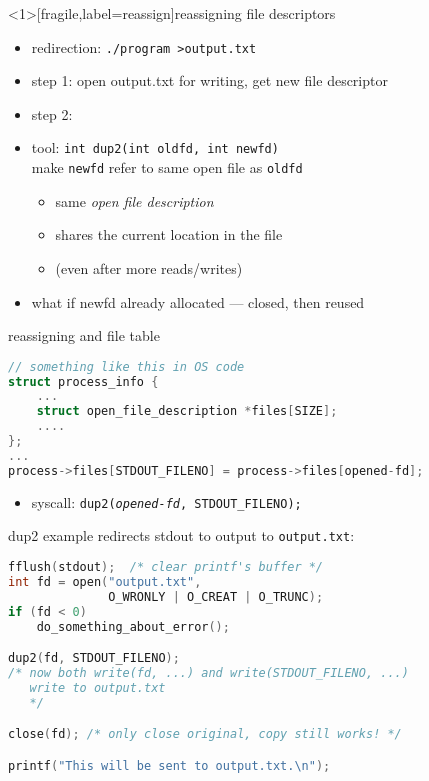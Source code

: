 \begin{frame}<1>[fragile,label=reassign]{reassigning file descriptors}
\begin{itemize}
\item redirection: \verb|./program >output.txt|
\item step 1: open output.txt for writing, get new file descriptor
\item step 2: 
\vspace{.5cm}
\item<2-> tool: \texttt{int dup2(int oldfd, int newfd)} \\
        make \texttt{newfd} refer to same open file as \texttt{oldfd}
    \begin{itemize}
    \item same \textit{open file description}
    \item shares the current location in the file
    \item (even after more reads/writes)
    \end{itemize}
\item<2-> what if newfd already allocated --- closed, then reused
\end{itemize}
\end{frame}

\begin{frame}[fragile,label=dup2AndTable]{reassigning and file table}
\begin{lstlisting}[language=C,style=smaller]
// something like this in OS code
struct process_info { 
    ...
    struct open_file_description *files[SIZE];
    ....
};
...
process->files[STDOUT_FILENO] = process->files[opened-fd];
\end{lstlisting}
\begin{itemize}
\item syscall: \texttt{dup2(\textit{opened-fd}, STDOUT\_FILENO);}
\end{itemize}
\end{frame}


\begin{frame}[fragile,label=dup2example]{dup2 example}
redirects stdout to output to \texttt{output.txt}:
\begin{lstlisting}[language=C++,style=small]
fflush(stdout);  /* clear printf's buffer */
int fd = open("output.txt",
              O_WRONLY | O_CREAT | O_TRUNC);
if (fd < 0)
    do_something_about_error();

dup2(fd, STDOUT_FILENO);
/* now both write(fd, ...) and write(STDOUT_FILENO, ...) 
   write to output.txt
   */

close(fd); /* only close original, copy still works! */

printf("This will be sent to output.txt.\n");
\end{lstlisting}
\end{frame}

